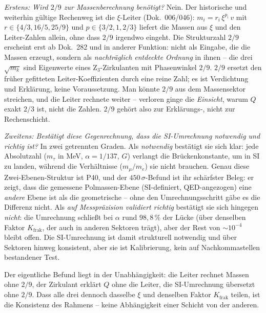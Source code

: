 \emph{Erstens: Wird $2/9$ zur Massenberechnung benötigt?} Nein. Der
historische und weiterhin gültige Rechenweg ist die $\xi$-Leiter
(Dok.~006/046): $m_i=r_i\,\xi^{p_i}\,v$ mit $r\in\{4/3,16/5,25/9\}$ und
$p\in\{3/2,1,2/3\}$ liefert die Massen aus $\xi$ und den Leiter-Zahlen
allein, ohne dass $2/9$ irgendwo eingeht. Die Strukturzahl $2/9$ erscheint
erst ab Dok.~282 und in anderer Funktion: nicht als Eingabe, die die Massen
erzeugt, sondern als \emph{nachträglich entdeckte Ordnung} in ihnen -- die
drei $\sqrt{m_k}$ sind Eigenwerte eines Z$_3$-Zirkulanten mit Phasenwinkel
$2/9$. $2/9$ ersetzt den früher gefitteten Leiter-Koeffizienten durch eine
reine Zahl; es ist Verdichtung und Erklärung, keine Voraussetzung. Man
könnte $2/9$ aus dem Massensektor streichen, und die Leiter rechnete
weiter -- verloren ginge die \emph{Einsicht}, warum $Q$ exakt $2/3$ ist,
nicht die Zahlen. $2/9$ gehört also zur Erklärungs-, nicht zur
Rechenschicht.

\emph{Zweitens: Bestätigt diese Gegenrechnung, dass die SI-Umrechnung
notwendig und richtig ist?} In zwei getrennten Graden. Als
\emph{notwendig} bestätigt sie sich klar: jede Absolutzahl ($m_\tau$ in
MeV, $\alpha=1/137$, $G$) verlangt die Brückenkonstante, um in SI zu
landen, während die Verhältnisse ($m_\mu/m_e$) sie nicht brauchen. Genau
diese Zwei-Ebenen-Struktur ist P40, und der $450\,\sigma$-Befund ist ihr
schärfster Beleg: er zeigt, dass die gemessene Polmassen-Ebene (SI-definiert,
QED-angezogen) eine \emph{andere} Ebene ist als die geometrische -- ohne
den Umrechnungsschritt gäbe es die Differenz nicht. Als \emph{auf
Messpräzision validiert richtig} bestätigt sie sich hingegen \emph{nicht}:
die Umrechnung schließt bei $\alpha$ rund $98{,}8\,\%$ der Lücke (über
denselben Faktor $K_{\text{frak}}$, der auch in anderen Sektoren trägt),
aber der Rest von $\sim10^{-4}$ bleibt offen. Die SI-Umrechnung ist damit
strukturell notwendig und über Sektoren hinweg konsistent, aber sie ist
Kalibrierung, kein auf Nachkommastellen bestandener Test.

Der eigentliche Befund liegt in der Unabhängigkeit: die Leiter rechnet
Massen ohne $2/9$, der Zirkulant erklärt $Q$ ohne die Leiter, die
SI-Umrechnung übersetzt ohne $2/9$. Dass alle drei dennoch dasselbe $\xi$
und denselben Faktor $K_{\text{frak}}$ teilen, ist die Konsistenz des
Rahmens -- keine Abhängigkeit einer Schicht von der anderen.

